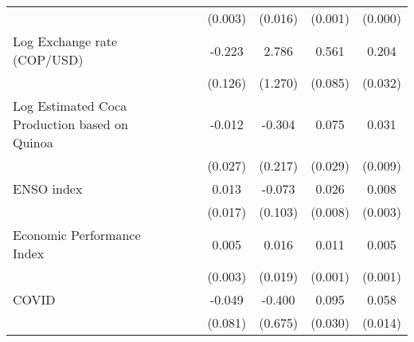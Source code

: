 \begin{tabular}{lcccccccc}
                    &                     &                     &                     &                     &     (0.003)         &     (0.016)         &     (0.001)         &     (0.000)         \\
\addlinespace
Log Exchange rate (COP/USD)&                     &                     &                     &                     &      -0.223         &       2.786\sym{*}  &       0.561\sym{***}&       0.204\sym{***}\\
                    &                     &                     &                     &                     &     (0.126)         &     (1.270)         &     (0.085)         &     (0.032)         \\
\addlinespace
Log Estimated Coca Production based on Quinoa&                     &                     &                     &                     &      -0.012         &      -0.304         &       0.075\sym{**} &       0.031\sym{**} \\
                    &                     &                     &                     &                     &     (0.027)         &     (0.217)         &     (0.029)         &     (0.009)         \\
\addlinespace
ENSO index          &                     &                     &                     &                     &       0.013         &      -0.073         &       0.026\sym{**} &       0.008\sym{*}  \\
                    &                     &                     &                     &                     &     (0.017)         &     (0.103)         &     (0.008)         &     (0.003)         \\
\addlinespace
Economic Performance Index&                     &                     &                     &                     &       0.005         &       0.016         &       0.011\sym{***}&       0.005\sym{***}\\
                    &                     &                     &                     &                     &     (0.003)         &     (0.019)         &     (0.001)         &     (0.001)         \\
\addlinespace
COVID               &                     &                     &                     &                     &      -0.049         &      -0.400         &       0.095\sym{**} &       0.058\sym{***}\\
                    &                     &                     &                     &                     &     (0.081)         &     (0.675)         &     (0.030)         &     (0.014)         \\

\end{tabular}
